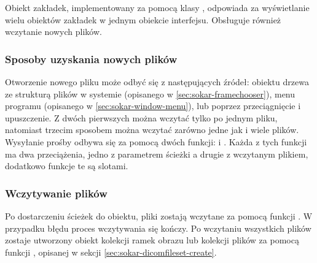 \label{sec:sokar-dicomtabs}

\par
Obiekt zakładek, implementowany za pomocą klasy , odpowiada za wyświetlanie wielu obiektów zakładek w jednym obiekcie interfejsu.
Obsługuje również wczytanie nowych plików.

\subsubsection{Sposoby uzyskania nowych plików}

\par
Otworzenie nowego pliku może odbyć się z następujących źródeł: obiektu drzewa ze strukturą plików w systemie (opisanego w \ref{sec:sokar-framechooser}), menu programu (opisanego w \ref{sec:sokar-window-menu}), lub poprzez przeciągnięcie i upuszczenie.
Z dwóch pierwszych można wczytać tylko po jednym pliku, natomiast trzecim sposobem można wczytać zarówno jedne jak i wiele plików.
Wysyłanie prośby odbywa się za pomocą dwóch funkcji:  i .
Każda z tych funkcji ma dwa przeciążenia, jedno z parametrem ścieżki a drugie z wczytanym plikiem, dodatkowo funkcje te są slotami.

\subsubsection{Wczytywanie plików}

\par
Po dostarczeniu ścieżek do obiektu, pliki zostają wczytane za pomocą funkcji .
W przypadku błędu proces wczytywania się kończy.
Po wczytaniu wszystkich plików zostaje utworzony obiekt kolekcji ramek obrazu lub kolekcji plików \DICOM za pomocą funkcji , opisanej w sekcji \ref{sec:sokar-dicomfileset-create}.
